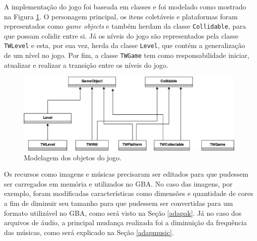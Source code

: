     A implementação do jogo foi baseada em classes e foi modelado como mostrado na Figura \ref{model-final}. O personagem principal, os itens coletáveis e plataformas foram representados como \textit{game objects} e também herdam da classe \texttt{Collidable}, para que possam colidir entre si. Já os níveis do jogo são representados pela classe \texttt{TWLevel} e esta, por sua vez, herda da classe \texttt{Level}, que contém a generalização de um nível no jogo. Por fim, a classe \texttt{TWGame} tem como responsabilidade iniciar, atualizar e realizar a transição entre os níveis do jogo.

    \begin{figure}[H]
      \centering \includegraphics[keepaspectratio=true,scale=0.6]{figuras/modelagem-final.eps}
      \caption[Modelagem dos objetos do jogo]
        {Modelagem dos objetos do jogo.}
      \label{model-final}
    \end{figure}

    Os recursos como imagens e músicas precisaram ser editados para que pudessem ser carregados em memória e utilizados no GBA. No caso das imagens, por exemplo, foram modificadas características como dimensões e quantidade de cores a fim de diminuir seu tamanho para que pudessem ser convertidas para um formato utilizável no GBA, como será visto na Seção \ref{adapak}. Já no caso dos arquivos de áudio, a principal mudança realizada foi a diminuição da frequência das músicas, como será explicado na Seção \ref{adapmusic}.
